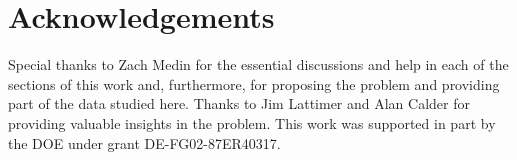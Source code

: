 \section{Acknowledgements}
Special thanks to Zach Medin for the essential discussions and help in each of the sections of this work  and, furthermore, for proposing the problem and providing part of the data studied here. Thanks to Jim Lattimer and Alan Calder for providing valuable insights in the problem. This work was supported in part by the DOE under grant DE-FG02-87ER40317.